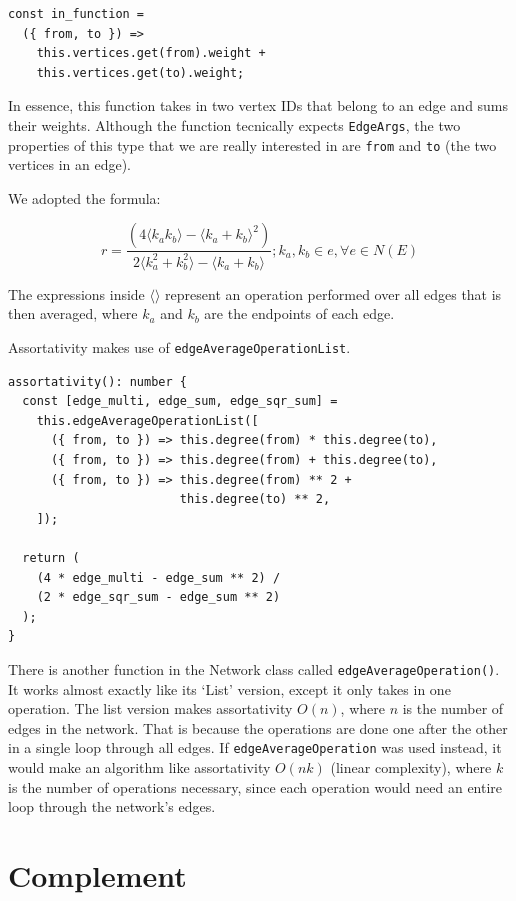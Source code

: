 \begin{verbatim}
const in_function =
  ({ from, to }) =>
    this.vertices.get(from).weight +
    this.vertices.get(to).weight;
\end{verbatim}

In essence, this function takes in two vertex IDs that belong to an edge and sums their weights.
Although the function tecnically expects \texttt{EdgeArgs},
the two properties of this type that we are really interested in are \texttt{from}
and \texttt{to} (the two vertices in an edge).

We adopted the formula:

$$r=\frac{(4\langle k_a k_b\rangle-\langle k_a+k_b\rangle^2)}{2\langle k_a^2+k_b^2\rangle-\langle k_a+k_b\rangle}; k_a, k_b \in e, \forall e \in N(E)$$

The expressions inside $\langle$$\rangle$ represent
an operation performed over all edges
that is then averaged,
where $k_a$ and $k_b$ are the endpoints of each edge.

Assortativity makes use of \texttt{edgeAverageOperationList}.

\begin{verbatim}
assortativity(): number {
  const [edge_multi, edge_sum, edge_sqr_sum] =
    this.edgeAverageOperationList([
      ({ from, to }) => this.degree(from) * this.degree(to),
      ({ from, to }) => this.degree(from) + this.degree(to),
      ({ from, to }) => this.degree(from) ** 2 +
                        this.degree(to) ** 2,
    ]);

  return (
    (4 * edge_multi - edge_sum ** 2) /
    (2 * edge_sqr_sum - edge_sum ** 2)
  );
}
\end{verbatim}

There is another function in the Network class called \texttt{edgeAverageOperation()}.
It works almost exactly like its `List' version, except it only takes in one operation.
The list version makes assortativity $O(n)$, where $n$ is the number of edges in the network.
That is because the operations are done one after the other in a single loop through all edges.
If \texttt{edgeAverageOperation} was used instead, it would make an algorithm like assortativity $O(nk)$ (linear complexity),
where $k$ is the number of operations necessary, since each operation would need an entire loop through the network's edges.

\section{Complement}

